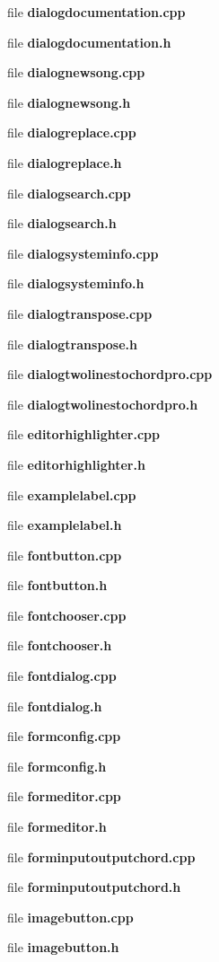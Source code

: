 \begin{DoxyCompactItemize}
file \textbf{ dialogdocumentation.\+cpp}
\item 
file \textbf{ dialogdocumentation.\+h}
\item 
file \textbf{ dialognewsong.\+cpp}
\item 
file \textbf{ dialognewsong.\+h}
\item 
file \textbf{ dialogreplace.\+cpp}
\item 
file \textbf{ dialogreplace.\+h}
\item 
file \textbf{ dialogsearch.\+cpp}
\item 
file \textbf{ dialogsearch.\+h}
\item 
file \textbf{ dialogsysteminfo.\+cpp}
\item 
file \textbf{ dialogsysteminfo.\+h}
\item 
file \textbf{ dialogtranspose.\+cpp}
\item 
file \textbf{ dialogtranspose.\+h}
\item 
file \textbf{ dialogtwolinestochordpro.\+cpp}
\item 
file \textbf{ dialogtwolinestochordpro.\+h}
\item 
file \textbf{ editorhighlighter.\+cpp}
\item 
file \textbf{ editorhighlighter.\+h}
\item 
file \textbf{ examplelabel.\+cpp}
\item 
file \textbf{ examplelabel.\+h}
\item 
file \textbf{ fontbutton.\+cpp}
\item 
file \textbf{ fontbutton.\+h}
\item 
file \textbf{ fontchooser.\+cpp}
\item 
file \textbf{ fontchooser.\+h}
\item 
file \textbf{ fontdialog.\+cpp}
\item 
file \textbf{ fontdialog.\+h}
\item 
file \textbf{ formconfig.\+cpp}
\item 
file \textbf{ formconfig.\+h}
\item 
file \textbf{ formeditor.\+cpp}
\item 
file \textbf{ formeditor.\+h}
\item 
file \textbf{ forminputoutputchord.\+cpp}
\item 
file \textbf{ forminputoutputchord.\+h}
\item 
file \textbf{ imagebutton.\+cpp}
\item 
file \textbf{ imagebutton.\+h}
\item 

\end{DoxyCompactItemize}
